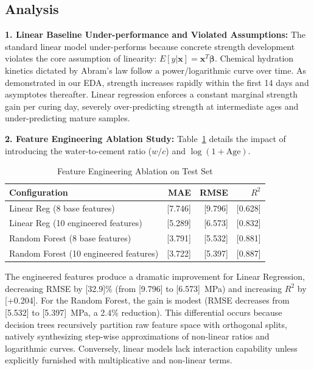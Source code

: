 \documentclass[conference]{IEEEtran}
\begin{document}
\subsection{Analysis}
\textbf{1. Linear Baseline Under-performance and Violated Assumptions:}
The standard linear model under-performs because concrete strength development violates the core assumption of linearity: $E[y|\mathbf{x}] = \mathbf{x}^T \boldsymbol{\beta}$. Chemical hydration kinetics dictated by Abram's law follow a power/logarithmic curve over time. As demonstrated in our EDA, strength increases rapidly within the first 14 days and asymptotes thereafter. Linear regression enforces a constant marginal strength gain per curing day, severely over-predicting strength at intermediate ages and under-predicting mature samples.

\textbf{2. Feature Engineering Ablation Study:}
Table~\ref{tab:ablation} details the impact of introducing the water-to-cement ratio ($w/c$) and $\log(1+\text{Age})$.

\begin{table}[htbp]
\caption{Feature Engineering Ablation on Test Set}
\label{tab:ablation}
\centering
\small
\begin{tabular}{lrrr}
\toprule
\textbf{Configuration} & \textbf{MAE} & \textbf{RMSE} & \textbf{$R^2$} \\
\midrule
Linear Reg (8 base features) & [7.746] & [9.796] & [0.628] \\
Linear Reg (10 engineered features) & [5.289] & [6.573] & [0.832] \\
Random Forest (8 base features) & [3.791] & [5.532] & [0.881] \\
Random Forest (10 engineered features) & [3.722] & [5.397] & [0.887] \\
\bottomrule
\end{tabular}
\end{table}

The engineered features produce a dramatic improvement for Linear Regression, decreasing RMSE by [32.9]\% (from [9.796] to [6.573]~MPa) and increasing $R^2$ by [+0.204]. For the Random Forest, the gain is modest (RMSE decreases from [5.532] to [5.397]~MPa, a 2.4\% reduction). This differential occurs because decision trees recursively partition raw feature space with orthogonal splits, natively synthesizing step-wise approximations of non-linear ratios and logarithmic curves. Conversely, linear models lack interaction capability unless explicitly furnished with multiplicative and non-linear terms.
\end{document}
